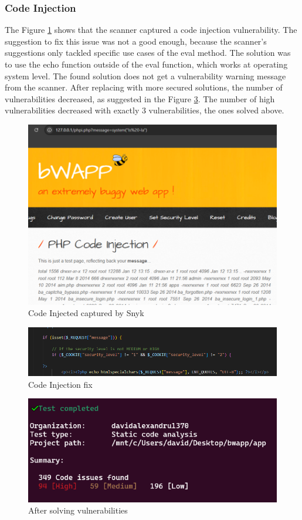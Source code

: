 \documentclass{article}
\begin{document}
\subsubsection{Code Injection}
\par The Figure \ref{fig:snyk-code-injection-issue} shows that the scanner captured a code injection vulnerability. The suggestion to fix this issue was not a good enough, because the scanner's suggestions only tackled specific use cases of the eval method. The solution was to use the echo function outside of the eval function, which works at operating system level. The found solution does not get a vulnerability warning message from the scanner. After replacing with more secured solutions, the number of vulnerabilities decreased, as suggested in the Figure \ref{fig:final-vulnerabilities-count}. The number of high vulnerabilities decreased with exactly 3 vulnerabilities, the ones solved above.
\begin{figure}[H]
    \centering
    \includegraphics[width=0.5\linewidth]{Figures/defensive/code-injection.PNG}
    \caption{Code Injected captured by Snyk}
    \label{fig:snyk-code-injection-issue}
\end{figure}
\begin{figure}[H]
    \centering
    \includegraphics[width=0.5\linewidth]{Figures/defensive/code-injection-snyk-fix.PNG}
    \caption{Code Injection fix}
    \label{fig:snyk-code-injection-fix}
\end{figure}
\begin{figure}[H]
    \centering
    \includegraphics[width=0.5\linewidth]{Figures/defensive/issues2.PNG}
    \caption{After solving vulnerabilities}
    \label{fig:final-vulnerabilities-count}
\end{figure}
\end{document}
